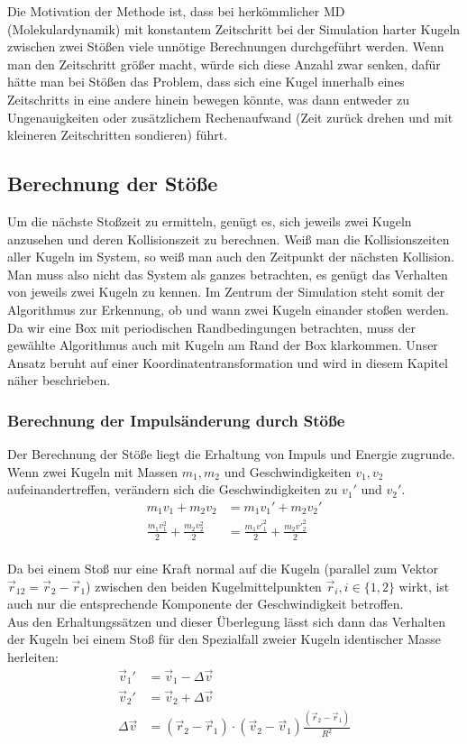 Die Motivation der Methode ist, dass bei herkömmlicher MD (Molekulardynamik) mit konstantem Zeitschritt bei der Simulation harter Kugeln zwischen zwei Stößen viele unnötige Berechnungen durchgeführt werden. Wenn man den Zeitschritt größer macht, würde sich diese Anzahl zwar senken, dafür hätte man bei Stößen das Problem, dass sich eine Kugel innerhalb eines Zeitschritts in eine andere hinein bewegen könnte, was dann entweder zu Ungenauigkeiten oder zusätzlichem Rechenaufwand (Zeit zurück drehen und mit kleineren Zeitschritten sondieren) führt.

\subsection{Berechnung der Stöße}
\newcommand{\reffig}[1]{Abbildung \ref{fig:#1}}

Um die nächste Stoßzeit zu ermitteln, genügt es, sich jeweils zwei Kugeln anzusehen und deren Kollisionszeit zu berechnen. Weiß man die Kollisionszeiten aller Kugeln im System, so weiß man auch den Zeitpunkt der nächsten Kollision. Man muss also nicht das System als ganzes betrachten, es genügt das Verhalten von jeweils zwei Kugeln zu kennen.
Im Zentrum der Simulation steht somit der Algorithmus zur Erkennung, ob und wann zwei Kugeln einander stoßen werden. 
Da wir eine Box mit periodischen Randbedingungen betrachten, muss der gewählte Algorithmus auch mit Kugeln am Rand der Box klarkommen. Unser Ansatz beruht auf einer Koordinatentransformation und wird in diesem Kapitel näher beschrieben.





\subsubsection{Berechnung der Impulsänderung durch Stöße}
Der Berechnung der Stöße liegt die Erhaltung von Impuls und Energie zugrunde. Wenn zwei Kugeln mit Massen $m_1,m_2$ und Geschwindigkeiten $v_1,v_2$ aufeinandertreffen, verändern sich die Geschwindigkeiten zu $v_1'$ und $v_2'$.
\begin{align*}
m_1v_1 + m_2v_2 &= m_1v_1'+m_2v_2'\\
\frac{m_1v^2_1}{2}+\frac{m_2v^2_2}{2} &= \frac{m_1v'^2_1}{2}+\frac{m_2v'^2_2}{2}
\end{align*}
\\
Da bei einem Stoß nur eine Kraft normal auf die Kugeln (parallel zum Vektor $\vec r_{12} = \vec r_2 - \vec r_1$) zwischen den beiden Kugelmittelpunkten $\vec r_i, i\in \{1,2\}$ wirkt, ist auch nur die entsprechende Komponente der Geschwindigkeit betroffen.\\
Aus den Erhaltungssätzen und dieser Überlegung lässt sich dann das Verhalten der Kugeln bei einem Stoß für den Spezialfall zweier Kugeln identischer Masse herleiten:
\begin{align*}
\vec v_1' &= \vec v_1 - \Delta \vec v\\
\vec v_2'& = \vec v_2 + \Delta \vec v\\
\Delta\vec v &= \left(\vec r_2 - \vec r_1\right) \cdot \left(\vec v_2 - \vec v_1\right)\frac{\left(\vec r_2 - \vec r_1\right)}{R^2}
\end{align*}

